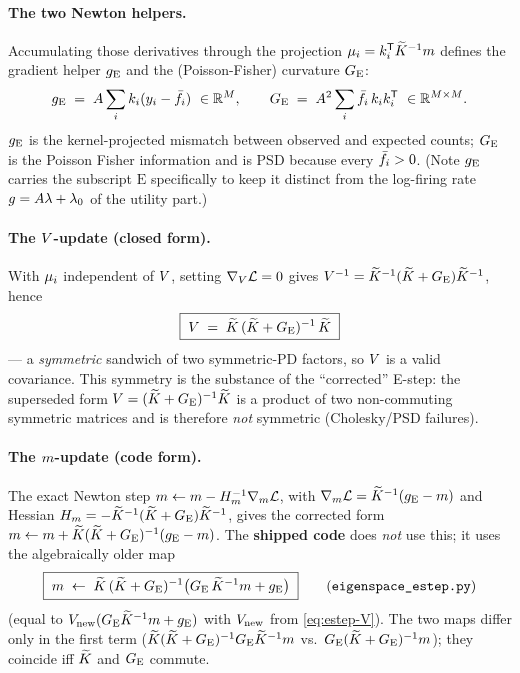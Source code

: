 \paragraph{The two Newton helpers.}
Accumulating those derivatives through the projection $\mu_i=k_i^{\mathsf{T}}\widetilde{K}^{-1}m$
defines the gradient helper $g_{\mathrm{E}}$ and the (Poisson-Fisher) curvature $G_{\mathrm{E}}$:
\begin{equation}
\gE \;=\; \gain\sum_i \kvec_i(\spk_i-\fbar_i)\ \in\Reals^{\Mind},
\qquad
\GE \;=\; \gain^2\sum_i \fbar_i\,\kvec_i\kvec_i\transpose\ \in\Reals^{\Mind\times\Mind}.
\label{eq:estep-gG}
\end{equation}
$g_{\mathrm{E}}$ is the kernel-projected mismatch between observed and expected counts;
$G_{\mathrm{E}}$ is the Poisson Fisher information and is PSD because every $\bar{f}_i>0$.
(Note $g_{\mathrm{E}}$ carries the subscript $\mathrm{E}$ specifically to keep it distinct
from the log-firing rate $g=A\lambda+\lambda_{0}$ of the utility part.)

\paragraph{The $V$-update (closed form).}
With $\mu_i$ independent of $V$, setting $\nabla_{V}\mathcal{L}=0$ gives
$V^{-1}=\widetilde{K}^{-1}(\widetilde{K}+G_{\mathrm{E}})\widetilde{K}^{-1}$, hence
\begin{equation}
\boxed{\;V \;=\; \widetilde{K}\,(\widetilde{K}+G_{\mathrm{E}})^{-1}\,\widetilde{K}\;}
\label{eq:estep-V}
\end{equation}
--- a \emph{symmetric} sandwich of two symmetric-PD factors, so $V$ is a valid
covariance. This symmetry is the substance of the ``corrected'' E-step: the
superseded form $V=(\widetilde{K}+G_{\mathrm{E}})^{-1}\widetilde{K}$ is a product of two non-commuting
symmetric matrices and is therefore \emph{not} symmetric (Cholesky/PSD failures).

\paragraph{The $m$-update (code form).}
The exact Newton step $m\leftarrow m-H_{m}^{-1}\nabla_{m}\mathcal{L}$, with
$\nabla_{m}\mathcal{L}=\widetilde{K}^{-1}(g_{\mathrm{E}}-m)$ and Hessian
$H_{m}=-\widetilde{K}^{-1}(\widetilde{K}+G_{\mathrm{E}})\widetilde{K}^{-1}$, gives the corrected form
$m\leftarrow m+\widetilde{K}(\widetilde{K}+G_{\mathrm{E}})^{-1}(g_{\mathrm{E}}-m)$. The \textbf{shipped code} does
\emph{not} use this; it uses the algebraically older map
\begin{equation}
\boxed{\;m \;\leftarrow\; \widetilde{K}\,(\widetilde{K}+G_{\mathrm{E}})^{-1}\big(G_{\mathrm{E}}\,\widetilde{K}^{-1}m+g_{\mathrm{E}}\big)\;}
\qquad(\texttt{eigenspace\_estep.py})
\label{eq:estep-m}
\end{equation}
(equal to $V_{\mathrm{new}}(G_{\mathrm{E}}\widetilde{K}^{-1}m+g_{\mathrm{E}})$ with $V_{\mathrm{new}}$ from
\eqref{eq:estep-V}). The two maps differ only in the first term
($\widetilde{K}(\widetilde{K}+G_{\mathrm{E}})^{-1}G_{\mathrm{E}}\widetilde{K}^{-1}m$ vs.\ $G_{\mathrm{E}}(\widetilde{K}+G_{\mathrm{E}})^{-1}m$); they
coincide iff $\widetilde{K}$ and $G_{\mathrm{E}}$ commute.


